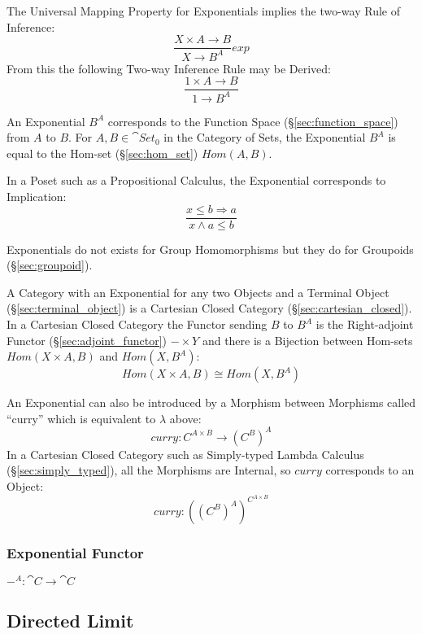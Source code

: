 The Universal Mapping Property for Exponentials implies the two-way
Rule of Inference:
\[
  {
    \frac{X \times A \rightarrow B}
    {X \rightarrow B^A}
  }exp
\]
From this the following Two-way Inference Rule may be Derived:
\[
    \frac{1 \times A \rightarrow B}
    {1 \rightarrow B^A}
\]

An Exponential $B^A$ corresponds to the Function Space
(\S\ref{sec:function_space}) from $A$ to $B$. For $A,B \in
\cat{Set}_0$ in the Category of Sets, the Exponential $B^A$ is
equal to the Hom-set (\S\ref{sec:hom_set}) $Hom(A,B)$.

In a Poset such as a Propositional Calculus, the Exponential
corresponds to Implication:
\[
    \frac{x \leq b \Rightarrow a}
    {x \wedge a \leq b}
\]

Exponentials do not exists for Group Homomorphisms but they do for
Groupoids (\S\ref{sec:groupoid}).

A Category with an Exponential for any two Objects and a Terminal
Object (\S\ref{sec:terminal_object}) is a Cartesian Closed Category
(\S\ref{sec:cartesian_closed}). In a Cartesian Closed Category the
Functor sending $B$ to $B^A$ is the Right-adjoint Functor
(\S\ref{sec:adjoint_functor}) $- \times Y$ and there is a Bijection
between Hom-sets $Hom(X \times A, B)$ and $Hom(X, B^A)$:
\[
  Hom(X \times A, B) \cong Hom(X, B^A)
\]

An Exponential can also be introduced by a Morphism between Morphisms
called ``curry'' which is equivalent to $\lambda$ above:
\[
  curry : C^{A \times B} \rightarrow (C^B)^A
\]
In a Cartesian Closed Category such as Simply-typed Lambda Calculus
(\S\ref{sec:simply_typed}), all the Morphisms are Internal, so $curry$
corresponds to an Object:
\[
  curry : ((C^B)^A)^{C^{A \times B}}
\]



\subsubsection{Exponential Functor}\label{sec:exponential_functor}

$-^A : \cat{C} \rightarrow \cat{C}$



\subsection{Directed Limit}\label{sec:directed_limit}


